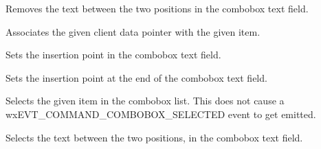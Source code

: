 
\label{wxcomboboxremove}


Removes the text between the two positions in the combobox text field.




\label{wxcomboboxsetclientdata}


Associates the given client data pointer with the given item.




\label{wxcomboboxsetinsertionpoint}


Sets the insertion point in the combobox text field.



\label{wxcomboboxsetinsertionpointend}


Sets the insertion point at the end of the combobox text field.

\label{wxcomboboxsetselection}


Selects the given item in the combobox list. This does not cause a
wxEVT\_COMMAND\_COMBOBOX\_SELECTED event to get emitted.


Selects the text between the two positions, in the combobox text field.




